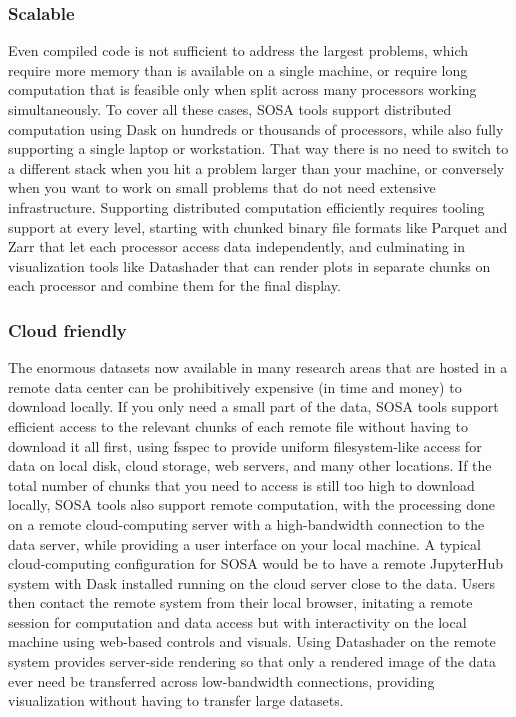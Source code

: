 \subsubsection{Scalable}
Even compiled code is not sufficient to address the largest problems, which require more memory than is available on a single machine, or require long computation that is feasible only when split across many processors working simultaneously. To cover all these cases, SOSA tools support distributed computation using Dask on hundreds or thousands of processors, while also fully supporting a single laptop or workstation. That way there is no need to switch to a different stack when you hit a problem larger than your machine, or conversely when you want to work on small problems that do not need extensive infrastructure. Supporting distributed computation efficiently requires tooling support at every level, starting with chunked binary file formats like Parquet and Zarr that let each processor access data independently, and culminating in visualization tools like Datashader that can render plots in separate chunks on each processor and combine them for the final display.

\subsubsection{Cloud friendly}
The enormous datasets now available in many research areas that are hosted in a remote data center can be prohibitively expensive (in time and money) to download locally. If you only need a small part of the data, SOSA tools support efficient access to the relevant chunks of each remote file without having to download it all first, using fsspec to provide uniform filesystem-like access for data on local disk, cloud storage, web servers, and many other locations. If the total number of chunks that you need to access is still too high to download locally, SOSA tools also support remote computation, with the processing done on a remote cloud-computing server with a high-bandwidth connection to the data server, while providing a user interface on your local machine. A typical cloud-computing configuration for SOSA would be to have a remote JupyterHub system with Dask installed running on the cloud server close to the data. Users then contact the remote system from their local browser, initating a remote session for computation and data access but with interactivity on the local machine using web-based controls and visuals. Using Datashader on the remote system provides server-side rendering so that only a rendered image of the data ever need be transferred across low-bandwidth connections, providing visualization without having to transfer large datasets.

